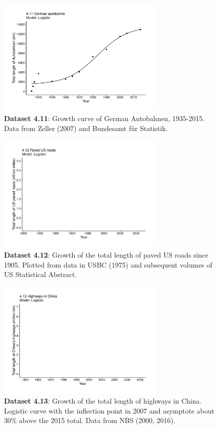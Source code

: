 \documentclass[aps,rmp,preprint,superscriptaddress,10pt,onecolumn]{article}
\begin{document}
\begin{figure}[h]
\includegraphics[width=8cm]{output/figs-ggplot/4.11.pdf}
\caption{\textbf{Dataset 4.11}: Growth curve of German Autobahnen, 1935-2015. Data from Zeller (2007) and Bundesamt für Statistik.}
\end{figure}
	
\begin{figure}[h]
\includegraphics[width=8cm]{output/figs-ggplot/4.12.pdf}
\caption{\textbf{Dataset 4.12}: Growth of the total length of paved US roads since 1905. Plotted from data in USBC (1975) and subsequent volumes of US Statistical Abstract.}
\end{figure}
	
\begin{figure}[h]
\includegraphics[width=8cm]{output/figs-ggplot/4.13.pdf}
\caption{\textbf{Dataset 4.13}: Growth of the total length of highways in China. Logistic curve with the inflection point in 2007 and asymptote about 30\% above the 2015 total. Data from NBS (2000, 2016).}
\end{figure}
	
\end{document}
